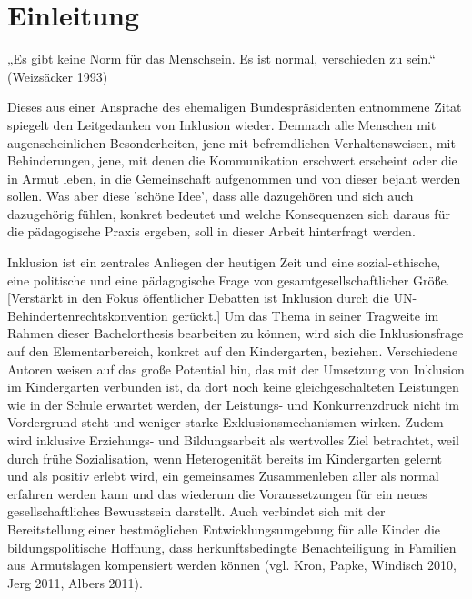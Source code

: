 \chapter{Einleitung}

„Es gibt keine Norm für das Menschsein. Es ist normal, verschieden zu sein.“ (Weizsäcker 1993) 

Dieses aus einer Ansprache des ehemaligen Bundespräsidenten entnommene Zitat spiegelt den Leitgedanken von Inklusion wieder. Demnach alle Menschen mit augenscheinlichen Besonderheiten, jene mit befremdlichen Verhaltensweisen, mit Behinderungen, jene, mit denen die Kommunikation erschwert erscheint oder die in Armut leben, in die Gemeinschaft aufgenommen und von dieser bejaht werden sollen. 
Was aber diese 'schöne Idee', dass alle dazugehören und sich auch dazugehörig fühlen, konkret bedeutet und welche Konsequenzen sich daraus für die pädagogische Praxis ergeben, soll in dieser Arbeit hinterfragt werden.

Inklusion ist ein zentrales Anliegen der heutigen Zeit und eine sozial-ethische, eine politische und eine pädagogische Frage von gesamtgesellschaftlicher Größe. [Verstärkt in den Fokus öffentlicher Debatten ist Inklusion durch die UN-Behindertenrechtskonvention gerückt.]
Um das Thema in seiner Tragweite im Rahmen dieser Bachelorthesis bearbeiten zu können, wird 
sich die Inklusionsfrage auf den Elementarbereich, konkret auf den Kindergarten, beziehen. Verschiedene Autoren weisen auf das große Potential hin, das mit der Umsetzung von Inklusion im Kindergarten verbunden ist, da dort noch keine gleichgeschalteten Leistungen wie in der Schule erwartet werden, der Leistungs- und Konkurrenzdruck nicht im Vordergrund steht und weniger starke Exklusionsmechanismen wirken. Zudem wird inklusive Erziehungs- und Bildungsarbeit als wertvolles Ziel betrachtet, weil durch frühe Sozialisation, wenn Heterogenität bereits im Kindergarten gelernt und als positiv erlebt wird, ein gemeinsames Zusammenleben aller als normal erfahren werden kann und das wiederum die Voraussetzungen für ein neues gesellschaftliches Bewusstsein darstellt. Auch verbindet sich mit der Bereitstellung einer bestmöglichen Entwicklungsumgebung für alle Kinder die bildungspolitische Hoffnung, dass herkunftsbedingte Benachteiligung in Familien aus Armutslagen kompensiert werden können (vgl. Kron, Papke, Windisch 2010, Jerg 2011, Albers 2011). 


